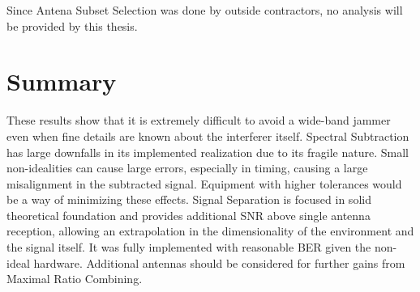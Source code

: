 Since Antena Subset Selection was done by outside contractors, no analysis will be provided by this thesis.  

\section{Summary}

These results show that it is extremely difficult to avoid a wide-band jammer even when fine details are known about the interferer itself.  Spectral Subtraction has large downfalls in its implemented realization due to its fragile nature.  Small non-idealities can cause large errors, especially in timing, causing a large misalignment in the subtracted signal.  Equipment with higher tolerances would be a way of minimizing these effects.  Signal Separation is focused in solid theoretical foundation and provides additional SNR above single antenna reception, allowing an extrapolation in the dimensionality of the environment and the signal itself.  It was fully implemented with reasonable BER given the non-ideal hardware.  Additional antennas should be considered for further gains from Maximal Ratio Combining.\\




